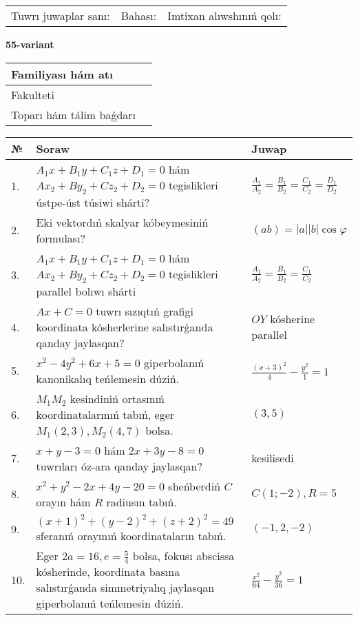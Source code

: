 \documentclass{article}
\begin{document}
\vspace{1cm}

\begin{tabular}{lll}
Tuwrı juwaplar sanı: \underline{\hspace{1.5cm}} & 
Bahası: \underline{\hspace{1.5cm}} & 
Imtixan alıwshınıń qolı: \underline{\hspace{2cm}} \\
\end{tabular}

\egroup

\newpage


\textbf{55-variant}\\

\bgroup
\def\arraystretch{1.6} %

\begin{tabular}{|m{5.7cm}|m{9.5cm}|}
\hline
Familiyası hám atı & \\
\hline
Fakulteti  & \\
\hline
Toparı hám tálim baǵdarı  & \\
\hline
\end{tabular}

\vspace{1cm}

\begin{tabular}{|m{0.7cm}|m{10cm}|m{4cm}|}
\hline
№ & Soraw & Juwap \\
\hline
1. & $A_1x+B_1y+C_1z+D_1=0$ hám $Ax_2+By_2+Cz_2+D_2=0$ tegislikleri ústpe-úst túsiwi shárti? & $\frac{A_1}{A_2}=\frac{B_1}{B_2}=\frac{C_1}{C_2}=\frac{D_1}{D_2}$ \\
\hline
2. & Eki vektordıń skalyar kóbeymesiniń formulası? & $(ab)=|a||b|\cos\varphi$ \\
\hline
3. & $A_1x+B_1y+C_1z+D_1=0$ hám $Ax_2+By_2+Cz_2+D_2=0$ tegislikleri parallel bolıwı shárti & $\frac{A_1}{A_2}=\frac{B_1}{B_2}=\frac{C_1}{C_2}$ \\
\hline
4. & $Ax+C=0$ tuwrı sızıqtıń grafigi koordinata kósherlerine salıstırǵanda qanday jaylasqan? & $OY$ kósherine parallel \\
\hline
5. & $x^{2}-4y^{2}+6x+5=0$ giperbolanıń kanonikalıq teńlemesin dúziń. & $\frac{(x+3)^{2}}{4}-\frac{y^{2}}{1}=1$ \\
\hline
6. & $M_{1}M_{2}$ kesindiniń ortasınıń koordinatalarınıń tabıń, eger $M_{1} (2, 3), M_{2} (4, 7)$ bolsa. & $(3,5)$ \\
\hline
7. & $x+y-3=0$ hám $2x+3y-8=0$ tuwrıları óz-ara qanday jaylasqan? & kesilisedi \\
\hline
8. & $x^{2}+y^{2}-2x+4y-20=0$ sheńberdiń $C$ orayın hám $R$ radiusın tabıń. & $C(1;-2), R=5$ \\
\hline
9. & $(x+1)^{2}+(y-2) ^{2}+(z+2) ^{2}=49$ sferanıń orayınıń koordinataların tabıń. & $(-1,2,-2)$ \\
\hline
10. & Eger $2a=16, e=\frac{5}{4}$ bolsa, fokusı abscissa kósherinde, koordinata basına salıstırǵanda simmetriyalıq jaylasqan giperbolanıń teńlemesin dúziń. & $\frac{x^{2}}{64}-\frac{y^{2}}{36}=1$ \\
\hline
\end{tabular}
\end{document}
